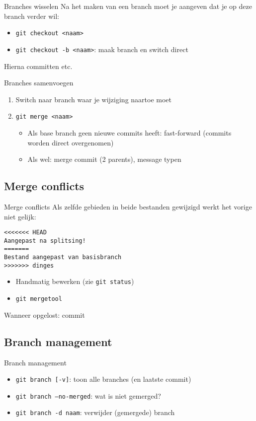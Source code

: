 \begin{frame}{Branches wisselen}
	Na het maken van een branch moet je aangeven dat je op deze branch verder wil:
	\begin{itemize}
		\item \texttt{git checkout <naam>}
		\item \texttt{git checkout -b <naam>}: maak branch en switch direct
	\end{itemize}
	Hierna committen etc.
\end{frame}

\begin{frame}{Branches samenvoegen}
	\begin{enumerate}
		\item Switch naar branch waar je wijziging naartoe moet
		\item \texttt{git merge <naam>}
			\begin{itemize}
				\item Als base branch geen nieuwe commits heeft: fast-forward (commits worden direct overgenomen)
				\item Als wel: merge commit (2 parents), message typen
			\end{itemize}
	\end{enumerate}
\end{frame}

\subsection{Merge conflicts}
\begin{frame}[fragile]{Merge conflicts}
	Als zelfde gebieden in beide bestanden gewijzigd werkt het vorige niet gelijk:
	\begin{verbatim}
<<<<<<< HEAD
Aangepast na splitsing!
=======
Bestand aangepast van basisbranch
>>>>>>> dinges
	\end{verbatim}
	\begin{itemize}
		\item Handmatig bewerken (zie \texttt{git status})
		\item \texttt{git mergetool}
	\end{itemize}
	Wanneer opgelost: commit
\end{frame}

\subsection{Branch management}
\begin{frame}{Branch management}
	\begin{itemize}
		\item \texttt{git branch [-v]}: toon alle branches (en laatste commit)
		\item \texttt{git branch --no-merged}: wat is niet gemerged?
		\item \texttt{git branch -d naam}: verwijder (gemergede) branch
	\end{itemize}
\end{frame}


